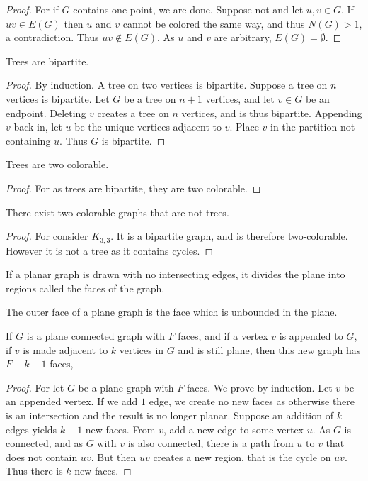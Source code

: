 \documentclass[crop=false,class=book]{standalone}
\begin{document}
\begin{proof}
For if $G$ contains one point, we are done. Suppose not and let $u,v\in G$. If $uv \in E(G)$ then $u$ and $v$ cannot be colored the same way, and thus $N(G)>1$, a contradiction. Thus $uv\notin E(G)$. As $u$ and $v$ are arbitrary, $E(G) = \emptyset$.
\end{proof}
\begin{lemma}
Trees are bipartite.
\end{lemma}
\begin{proof}
By induction. A tree on two vertices is bipartite. Suppose a tree on $n$ vertices is bipartite. Let $G$ be a tree on $n+1$ vertices, and let $v\in G$ be an endpoint. Deleting $v$ creates a tree on $n$ vertices, and is thus bipartite. Appending $v$ back in, let $u$ be the unique vertices adjacent to $v$. Place $v$ in the partition not containing $u$. Thus $G$ is bipartite.
\end{proof}
\begin{corollary}
Trees are two colorable.
\end{corollary}
\begin{proof}
For as trees are bipartite, they are two colorable.
\end{proof}
\begin{corollary}
There exist two-colorable graphs that are not trees.
\end{corollary}
\begin{proof}
For consider $K_{3,3}$. It is a bipartite graph, and is therefore two-colorable. However it is not a tree as it contains cycles.
\end{proof}
\begin{definition}
If a planar graph is drawn with no intersecting edges, it divides the plane into regions called the faces of the graph.
\end{definition}
\begin{definition}
The outer face of a plane graph is the face which is unbounded in the plane.
\end{definition}
\begin{lemma}
If $G$ is a plane connected graph with $F$ faces, and if a vertex $v$ is appended to $G$, if $v$ is made adjacent to $k$ vertices in $G$ and is still plane, then this new graph has $F+k-1$ faces,
\end{lemma}
\begin{proof}
For let $G$ be a plane graph with $F$ faces. We prove by induction. Let $v$ be an appended vertex. If we add $1$ edge, we create no new faces as otherwise there is an intersection and the result is no longer planar. Suppose an addition of $k$ edges yields $k-1$ new faces. From $v$, add a new edge to some vertex $u$. As $G$ is connected, and as $G$ with $v$ is also connected, there is a path from $u$ to $v$ that does not contain $uv$. But then $uv$ creates a new region, that is the cycle on $uv$. Thus there is $k$ new faces.
\end{proof}
\end{document}

